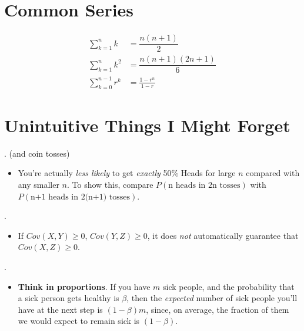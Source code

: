 \documentclass[12pt]{article}
\newcommand{\myspace}{\vspace{2\bigskipamount}}
\newcommand\p{\Needspace{12\baselineskip} \noindent}
\begin{document}

\clearpage
\appendix 


\clearpage
\section*{\Large{Common Series}}
\p {}
\begin{align}
	\sum_{k = 1}^{n} k &= \dfrac{n (n + 1) }{2} \\
	\sum_{k = 1}^{n} k^2 &= \dfrac{n (n + 1) (2n + 1)}{6} \\
	\sum_{k = 0}^{n - 1} r^k &= \frac{1 - r^n}{1 - r}
\end{align}


\myspace
\section*{\Large{Unintuitive Things I Might Forget}}

\p {}. (and coin tosses)
\begin{itemize}
	\item You're actually \textit{less likely} to get \emph{exactly} 50\% Heads for large $n$ compared with any smaller $n$. To show this, compare $P(\text{n heads in 2n tosses})$ with $P(\text{n+1 heads in 2(n+1) tosses})$. 
\end{itemize}

\myspace
\p {}. 
\begin{itemize}
	\item If $Cov(X, Y) \ge 0$, $Cov(Y, Z) \ge 0$, it does \textit{not} automatically guarantee that $Cov(X, Z) \ge 0$. 
\end{itemize}

\myspace
\p {}. 
\begin{itemize}
	\item \textbf{Think in proportions}. If you have $m$ sick people, and the probability that a sick person gets healthy is $\beta$, then the \textit{expected} number of sick people you'll have at the next step is $(1-\beta) m$, since, on average, the fraction of them we would expect to remain sick is $(1 - \beta)$. 
\end{itemize}
\end{document}
